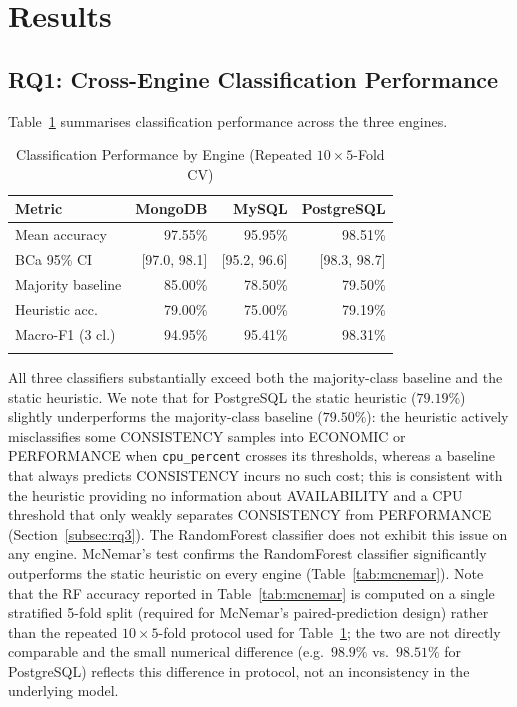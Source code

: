 \documentclass[pdflatex,sn-mathphys-num]{sn-jnl}
\theoremstyle{thmstyleone}
\theoremstyle{thmstylethree}
\begin{document}
\section{Results}\label{sec:results}

\subsection{RQ1: Cross-Engine Classification Performance}\label{subsec:rq1}

Table~\ref{tab:main-results} summarises classification performance
across the three engines.

\begin{table}[h]
\caption{Classification Performance by Engine (Repeated $10\times5$-Fold CV)}\label{tab:main-results}
\begin{tabular}{@{}lrrr@{}}
\toprule
Metric & MongoDB & MySQL & PostgreSQL \\
\midrule
Mean accuracy & 97.55\% & 95.95\% & 98.51\% \\
BCa 95\% CI & [97.0, 98.1] & [95.2, 96.6] & [98.3, 98.7] \\
Majority baseline & 85.00\% & 78.50\% & 79.50\% \\
Heuristic acc. & 79.00\% & 75.00\% & 79.19\% \\
Macro-F1 (3 cl.)\footnotemark[1] & 94.95\% & 95.41\% & 98.31\% \\
\botrule
\end{tabular}
\end{table}

All three classifiers substantially exceed both the majority-class
baseline and the static heuristic. We note that for PostgreSQL the
static heuristic ($79.19\%$) slightly underperforms the majority-class
baseline ($79.50\%$): the heuristic actively misclassifies some
CONSISTENCY samples into ECONOMIC or PERFORMANCE when
\texttt{cpu\_percent} crosses its thresholds, whereas a baseline that
always predicts CONSISTENCY incurs no such cost; this is consistent
with the heuristic providing no information about AVAILABILITY
and a CPU threshold that only weakly separates CONSISTENCY from
PERFORMANCE (Section~\ref{subsec:rq3}). The RandomForest classifier
does not exhibit this issue on any engine. McNemar's test confirms the
RandomForest classifier significantly outperforms the static
heuristic on every engine (Table~\ref{tab:mcnemar}). Note that the RF
accuracy reported in Table~\ref{tab:mcnemar} is computed on a single
stratified 5-fold split (required for McNemar's paired-prediction
design) rather than the repeated $10\times5$-fold protocol used for
Table~\ref{tab:main-results}; the two are not directly comparable and
the small numerical difference (e.g.\ $98.9\%$ vs.\ $98.51\%$ for
PostgreSQL) reflects this difference in protocol, not an
inconsistency in the underlying model.
\end{document}
